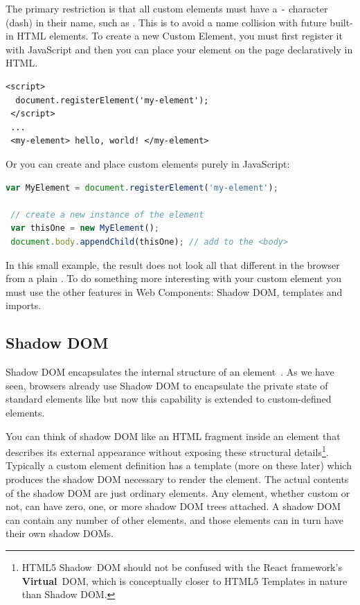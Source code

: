 The primary restriction is that all custom elements must have a \texttt{-} character (dash) in their name, such as . 
This is to avoid a name collision with future built-in HTML elements. 
To create a new Custom Element, you must first register it with JavaScript and then you can place your element on the page declaratively in HTML.

\begin{lstlisting}[language=HTML5,caption={Placing a custom element declaratively in HTML.},label=l:registerhtml]
 <script>
  document.registerElement('my-element');
 </script>
 ...
 <my-element> hello, world! </my-element>
\end{lstlisting}

Or you can create and place custom elements purely in JavaScript:

\begin{lstlisting}[language=JavaScript,caption={Placing a custom element imperatively in JavaScript\index{JavaScript}.},label=l:register]
 var MyElement = document.registerElement('my-element');

 // create a new instance of the element
 var thisOne = new MyElement();      
 document.body.appendChild(thisOne); // add to the <body>
\end{lstlisting}

In this small example, the result does not look all that different in the browser from a plain .
To do something more interesting with your custom element you must use the other features in Web Components: Shadow DOM, templates and imports.

\subsection{Shadow DOM}
\label{bg:shadowdom}
Shadow DOM encapsulates the internal structure of an element~\cite{w3ccontributors2015}. 
As we have seen, browsers already use Shadow DOM to encapsulate the private state of standard elements like  but now this capability is extended to custom-defined elements.

You can think of shadow DOM like an HTML fragment inside an element that describes its external appearance without exposing these structural details\footnote{
HTML5 Shadow~DOM should not be confused with the React framework's \textbf{Virtual}~DOM, which is conceptually closer to HTML5 Templates in nature than Shadow DOM.}. 
Typically a custom element definition has a template (more on these later) which produces the shadow DOM necessary to render the element.
The actual contents of the shadow DOM are just ordinary elements.
Any element, whether custom or not, can have zero, one, or more shadow DOM trees attached.
A shadow DOM can contain any number of other elements, and those elements can in turn have their own shadow DOMs.

